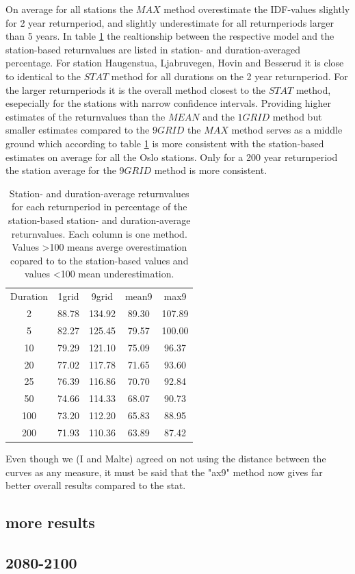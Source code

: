 On average for all stations the $MAX$ method overestimate the IDF-values slightly for 2 year returnperiod, and slightly underestimate for all returnperiods larger than 5 years. In table \ref{dist_eval} the realtionship between the respective model and the station-based returnvalues are listed in station- and duration-averaged percentage. For station Haugenstua, Ljabruvegen, Hovin and Besserud it is close to identical to the $STAT$ method for all durations on the 2 year returnperiod. For the larger returnperiods it is the overall method closest to the $STAT$ method, esepecially for the stations with narrow confidence intervals. Providing higher estimates of the returnvalues than the $MEAN$ and the $1GRID$ method but smaller estimates compared to the $9GRID$ the $MAX$ method serves as a middle ground which according to table \ref{dist_eval} is more consistent with the station-based estimates on average for all the Oslo stations. Only for a 200 year returnperiod the station average for the $9GRID$ method is more consistent.        

\begin{table}[hbt!]
\centering
\begin{tabular}{ c c c c c}

Duration & 1grid & 9grid & mean9 & max9 \\
2 & 88.78 & 134.92 & 89.30 & 107.89\\
5 & 82.27 & 125.45 & 79.57 & 100.00\\
10 & 79.29 & 121.10 & 75.09 & 96.37\\
20 & 77.02 & 117.78 & 71.65 & 93.60\\
25 & 76.39 & 116.86 & 70.70 & 92.84\\
50 & 74.66 & 114.33 & 68.07 & 90.73\\
100 & 73.20 & 112.20 & 65.83 & 88.95\\
200 & 71.93 & 110.36 & 63.89 & 87.42
\end{tabular}
\caption{Station- and duration-average returnvalues for each returnperiod in percentage of the station-based station- and duration-average returnvalues. Each column is one method. Values >100 means averge overestimation copared to to the station-based values and values <100 mean underestimation.}
\label{dist_eval}
\end{table}


Even though we (I and Malte) agreed on not using the distance between the curves as any measure, it must be said that the "ax9" method now gives far better overall results compared to the stat.

\subsection{more results}

\subsection{2080-2100}
